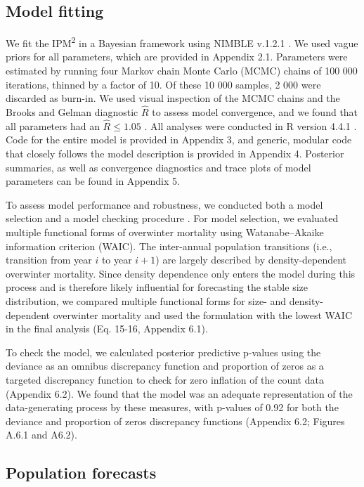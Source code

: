 \documentclass{article}
\begin{document}
\subsection{Model fitting}
We fit the IPM\textsuperscript{2} in a Bayesian framework using NIMBLE v.1.2.1 \parencite{de2017programming}. We used vague priors for all parameters, which are provided in Appendix 2.1. Parameters were estimated by running four Markov chain Monte Carlo (MCMC) chains of 100 000 iterations, thinned by a factor of 10. Of these 10 000 samples, 2 000 were discarded as burn-in. We used visual inspection of the MCMC chains and the Brooks and Gelman diagnostic $\hat{R}$ to assess model convergence, and we found that all parameters had an $\hat{R} \leq 1.05$ \parencite{brooks1998general}. All analyses were conducted in R version 4.4.1 \parencite{Rcore}. Code for the entire model is provided in Appendix 3, and generic, modular code that closely follows the model description is provided in Appendix 4. Posterior summaries, as well as convergence diagnostics and trace plots of model parameters can be found in Appendix 5.

To assess model performance and robustness, we conducted both a model selection and a model checking procedure \parencite{conn2018guide}. For model selection, we evaluated multiple functional forms of overwinter mortality using Watanabe–Akaike information criterion (WAIC). The inter-annual population transitions (i.e., transition from year $i$ to year $i + 1$) are largely described by density-dependent overwinter mortality. Since density dependence only enters the model during this process and is therefore likely influential for forecasting the stable size distribution, we compared multiple functional forms for size- and density-dependent overwinter mortality and used the formulation with the lowest WAIC in the final analysis (Eq. 15-16, Appendix 6.1).

To check the model, we calculated posterior predictive p-values using the deviance as an omnibus discrepancy function and proportion of zeros as a targeted discrepancy function to check for zero inflation of the count data (Appendix 6.2). We found that the model was an adequate representation of the data-generating process by these measures, with p-values of 0.92 for both the deviance and proportion of zeros discrepancy functions (Appendix 6.2; Figures A.6.1 and A6.2).


\subsection{Population forecasts}
\end{document}
